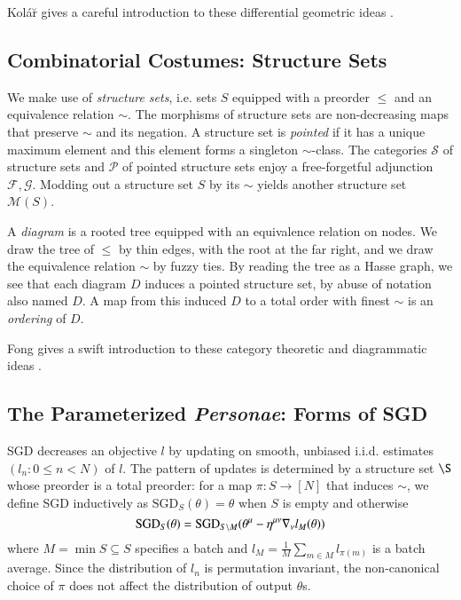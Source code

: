 \documentclass{article}
\newcommand{\Free}{\mathcal{F}}
\newcommand{\Forg}{\mathcal{G}}
\newcommand{\Mod}{\mathcal{M}}
\newcommand{\Ss}{\mathcal{S}}
\newcommand{\Pp}{\mathcal{P}}
\newcommand{\SGD}{\text{\textnormal{SGD}}}
\begin{document}
    Kol\'{a}\u{r} gives a careful introduction to these differential geometric
    ideas .

\subsection{Combinatorial Costumes: Structure Sets}
    We make use of \emph{structure sets}, i.e.  sets $S$ equipped with a
    preorder $\leq$ and an equivalence relation $\sim$.  The morphisms of
    structure sets are  non-decreasing maps that preserve $\sim$ and its
    negation.  A structure set is \emph{pointed} if it has a unique maximum
    element and this element forms a singleton $\sim$-class.  The categories
    $\Ss$ of structure sets and $\Pp$ of pointed structure sets enjoy a
    free-forgetful adjunction $\Free, \Forg$.  Modding out a structure set $S$
    by its $\sim$ yields another structure set $\Mod(S)$. 

    A \emph{diagram} is a rooted tree equipped with an equivalence relation on
    nodes.  We draw the tree of $\leq$ by thin edges, with the root at the far
    right, and we draw the equivalence relation $\sim$ by fuzzy ties.  By
    reading the tree as a Hasse graph, we see that each diagram $D$ induces a
    pointed structure set, by abuse of notation also named $D$.  A map from
    this induced $D$ to a total order with finest $\sim$ is an \emph{ordering}
    of $D$. 

    Fong gives a swift introduction to these category theoretic and
    diagrammatic ideas .
        
\subsection{The Parameterized \emph{Personae}: Forms of SGD}
    SGD decreases an objective $l$ by updating on smooth, unbiased i.i.d.
    estimates $(l_n: 0\leq n<N)$ of $l$.  The pattern of updates is determined
    by a structure set $\S$ whose preorder is a total preorder: for a map $\pi:S\to
    [N]$ that induces $\sim$, we define SGD inductively as
    $\text{SGD}_{S}(\theta) = \theta$ when $S$ is empty and otherwise
    $$
        \SGD_S(\theta) =
            \SGD_{S\setminus M}(\theta^\mu - \eta^{\mu\nu} \nabla_\nu l_{M}(\theta))
    $$
    where $M = \min S \subseteq S$ specifies a batch and $l_M =
    \frac{1}{M} \sum_{m\in M} l_{\pi(m)}$ is a batch average.  Since the
    distribution of $l_n$ is permutation invariant, the non-canonical choice
    of $\pi$ does not affect the distribution of output $\theta$s.
\end{document}
